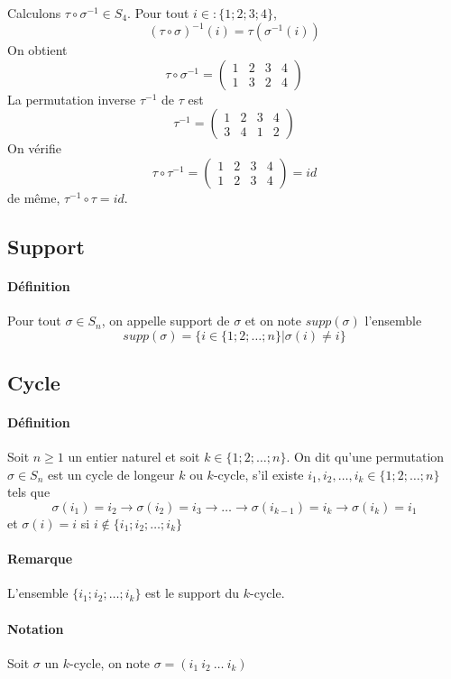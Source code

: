 Calculons $\tau \circ \sigma^{-1} \in S_4$. Pour tout $i \in :\{1; 2; 3; 4\}$,
$$(\tau \circ \sigma)^{-1}(i) = \tau(\sigma^{-1}(i))$$
On obtient
$$\tau \circ \sigma^{-1} = \begin{pmatrix} 1 & 2 & 3 & 4 \\ 1 & 3 & 2 & 4 \end{pmatrix}$$
La permutation inverse $\tau^{-1}$ de $\tau$ est
$$\tau^{-1} = \begin{pmatrix} 1 & 2 & 3 & 4 \\ 3 & 4 & 1 & 2 \end{pmatrix}$$
On vérifie
$$\tau \circ \tau^{-1} = \begin{pmatrix} 1 & 2 & 3 & 4 \\ 1 & 2 & 3 & 4 \end{pmatrix} = id$$
de même, $\tau^{-1} \circ \tau=id$.

%
\subsection{Support}
%
\paragraph{Définition} Pour tout $\sigma \in S_n$, on appelle support de $\sigma$ et on note $supp(\sigma)$ l'ensemble
$$supp(\sigma) = \{i \in \{1; 2; \ldots; n\} \vert \sigma(i) \neq i\}$$

%
\subsection{Cycle}
%
\paragraph{Définition} Soit $n \geq 1$ un entier naturel et soit $k \in \{1; 2; \ldots; n\}$. On dit qu'une permutation $\sigma \in S_n$ est un cycle de longeur $k$ ou $k$-cycle, s'il existe $i_1, i_2, \ldots, i_k \in  \{1; 2; \ldots; n\}$ tels que
$$\sigma(i_1) = i_2 \rightarrow \sigma(i_2) = i_3 \rightarrow \ldots \rightarrow \sigma(i_{k-1}) = i_k \rightarrow \sigma(i_k) = i_1$$
et $\sigma(i) = i$ si $i \notin \{i_1; i_2; \ldots; i_k\}$

\paragraph{Remarque} L'ensemble $\{i_1; i_2; \ldots; i_k\}$ est le support du $k$-cycle.

\paragraph{Notation} Soit $\sigma$ un $k$-cycle, on note $\sigma = (i_1 ~ i_2 ~ \ldots ~ i_k)$


